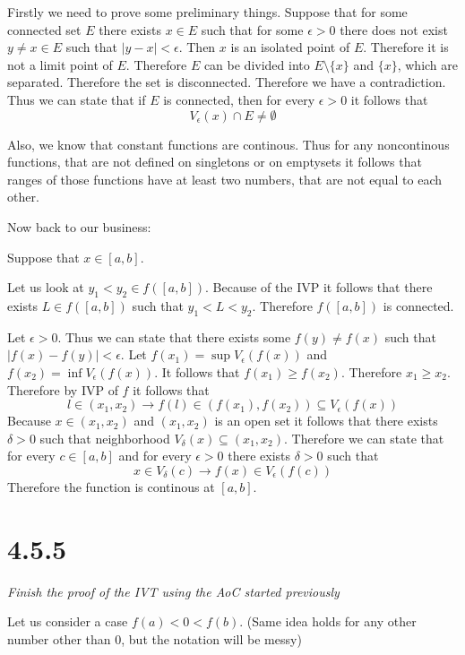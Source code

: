 \documentclass[11pt,oneside,titlepage]{book}
\begin{document}
Firstly we need to prove some preliminary things.
Suppose that for some connected set $E$ there exists $x \in E$ such
that for some $\epsilon > 0$ there does not exist $y \neq x \in E$ such
that $|y - x| < \epsilon$. Then $x$ is an isolated point of $E$.
Therefore it is not a limit point of $E$.
Therefore $E$ can be divided into $E \setminus \{x\}$ and $\{x\}$, which are
separated. Therefore the set is disconnected. Therefore we have a
contradiction. Thus we can state that if $E$ is connected,
then for every $\epsilon > 0$ it follows that 
$$V_\epsilon(x) \cap E \neq \emptyset$$

Also, we know that constant functions are continous. Thus for
any noncontinous functions, that are not defined on singletons
or on emptysets it follows that ranges of those functions have
at least two numbers, that are not equal to each other.

Now back to our business:

Suppose that $x \in [a, b]$.

Let us look at $y_1 < y_2 \in f([a, b])$. Because of the IVP
it follows that there
exists $L \in f([a, b])$ such that $ y_1 < L < y_2$. Therefore
$f([a, b])$ is connected.



Let $\epsilon > 0$.
Thus we can state that there exists some $f(y) \neq f(x)$ such that
$|f(x) - f(y)| < \epsilon$. Let $f(x_1) = \sup{V_\epsilon(f(x))}$
and $f(x_2) = \inf{V_\epsilon(f(x))}$. It follows that
$f(x_1) \geq f(x_2)$. Therefore $x_1 \geq x_2$. Therefore by IVP of $f$ 
it follows that
$$l \in (x_1, x_2) \to f(l) \in (f(x_1), f(x_2)) \subseteq V_\epsilon(f(x))$$
Because $x \in (x_1, x_2)$ and $(x_1, x_2)$ is an open set it follows that
there exists $\delta > 0$ such that neighborhood
$V_\delta(x) \subseteq (x_1, x_2)$. Therefore we can state that for every
$c \in [a, b]$ and
for every $\epsilon > 0$ there exists $\delta > 0$ such that
$$x \in V_\delta(c)  \to f(x) \in V_\epsilon(f(c))$$
Therefore the function is continous at $[a, b]$.

\section*{4.5.5}
\textit{Finish the proof of the IVT using the AoC started previously}

Let us consider a case $f(a) < 0 < f(b)$. (Same idea holds for any other
number other than 0, but the notation will be messy)
\end{document}
